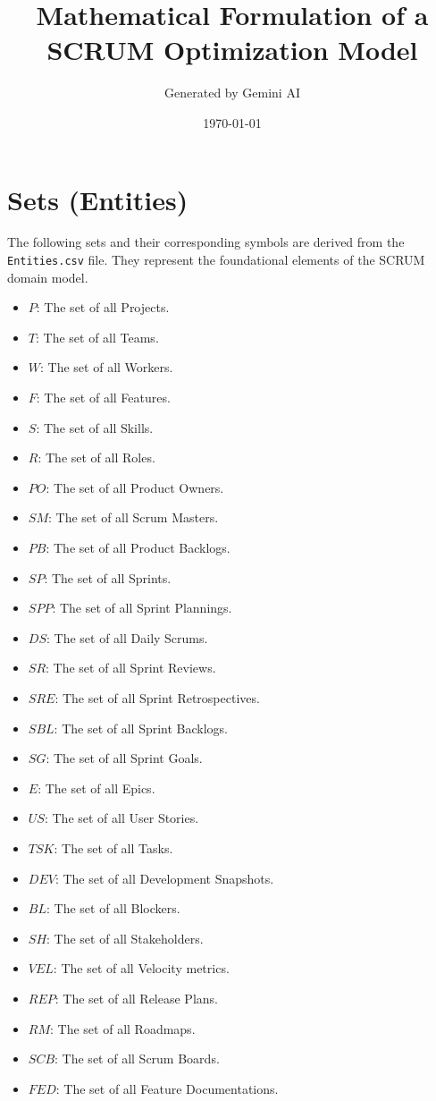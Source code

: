 \documentclass[11pt]{article}
\title{\textbf{Mathematical Formulation of a SCRUM Optimization Model}}
\author{Generated by Gemini AI}
\date{\today}
\begin{document}
\maketitle
\thispagestyle{empty}
\newpage
\tableofcontents
\newpage

\section{Sets (Entities)}
The following sets and their corresponding symbols are derived from the \texttt{Entities.csv} file. They represent the foundational elements of the SCRUM domain model.

\begin{itemize}
    \item $P$: The set of all Projects.
    \item $T$: The set of all Teams.
    \item $W$: The set of all Workers.
    \item $F$: The set of all Features.
    \item $S$: The set of all Skills.
    \item $R$: The set of all Roles.
    \item $PO$: The set of all Product Owners.
    \item $SM$: The set of all Scrum Masters.
    \item $PB$: The set of all Product Backlogs.
    \item $SP$: The set of all Sprints.
    \item $SPP$: The set of all Sprint Plannings.
    \item $DS$: The set of all Daily Scrums.
    \item $SR$: The set of all Sprint Reviews.
    \item $SRE$: The set of all Sprint Retrospectives.
    \item $SBL$: The set of all Sprint Backlogs.
    \item $SG$: The set of all Sprint Goals.
    \item $E$: The set of all Epics.
    \item $US$: The set of all User Stories.
    \item $TSK$: The set of all Tasks.
    \item $DEV$: The set of all Development Snapshots.
    \item $BL$: The set of all Blockers.
    \item $SH$: The set of all Stakeholders.
    \item $VEL$: The set of all Velocity metrics.
    \item $REP$: The set of all Release Plans.
    \item $RM$: The set of all Roadmaps.
    \item $SCB$: The set of all Scrum Boards.
    \item $FED$: The set of all Feature Documentations.
\end{itemize}
\end{document}
